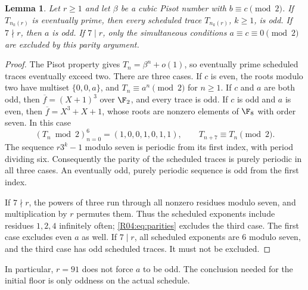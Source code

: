 \documentclass[11pt,a4paper]{article}
\newtheorem{lemma}[theorem]{Lemma}\newtheorem{proposition}[theorem]{Proposition}
\theoremstyle{definition}\newtheorem{definition}[theorem]{Definition}
\theoremstyle{remark}\newtheorem{remark}[theorem]{Remark}
\begin{document}
\begin{lemma}\label{R04:lem:parity}
Let $r\ge1$ and let $\beta$ be a cubic Pisot number with
$b\equiv c\pmod2$. If $T_{n_k(r)}$ is eventually prime, then every
scheduled trace $T_{n_k(r)}$, $k\ge1$, is odd. If $7\nmid r$, then
$a$ is odd. If $7\mid r$, only the simultaneous conditions
$a\equiv c\equiv0\pmod2$ are excluded by this parity argument.
\end{lemma}
\begin{proof}
The Pisot property gives $T_n=\beta^n+o(1)$, so eventually prime
scheduled traces eventually exceed two. There are three cases.
If $c$ is even, the roots modulo two have multiset $\{0,0,a\}$,
and $T_n\equiv a^n\pmod2$ for $n\ge1$.
If $c$ and $a$ are both odd, then
$\overline f=(X+1)^3$ over $\F_2$, and every trace is odd.
If $c$ is odd and $a$ is even, then
$\overline f=X^3+X+1$, whose roots are nonzero elements of $\F_8$
with order seven. In this case
\begin{equation}\label{R04:eq:parities}
 (T_n\bmod2)_{n=0}^{6}=(1,0,0,1,0,1,1),
 \qquad T_{n+7}\equiv T_n\pmod2.
\end{equation}
The sequence $r3^k-1$ modulo seven is periodic from its first index,
with period dividing six. Consequently the parity of the scheduled
traces is purely periodic in all three cases. An eventually odd,
purely periodic sequence is odd from the first index.

If $7\nmid r$, the powers of three run through all nonzero residues
modulo seven, and multiplication by $r$ permutes them. Thus the
scheduled exponents include residues $1,2,4$ infinitely often;
\eqref{R04:eq:parities} excludes the third case. The first case excludes
even $a$ as well. If $7\mid r$, all scheduled exponents are $6$ modulo
seven, and the third case has odd scheduled traces. It must not be
excluded.
\end{proof}

In particular, $r=91$ does not force $a$ to be odd. The conclusion
needed for the initial floor is only oddness on the actual schedule.
\end{document}
